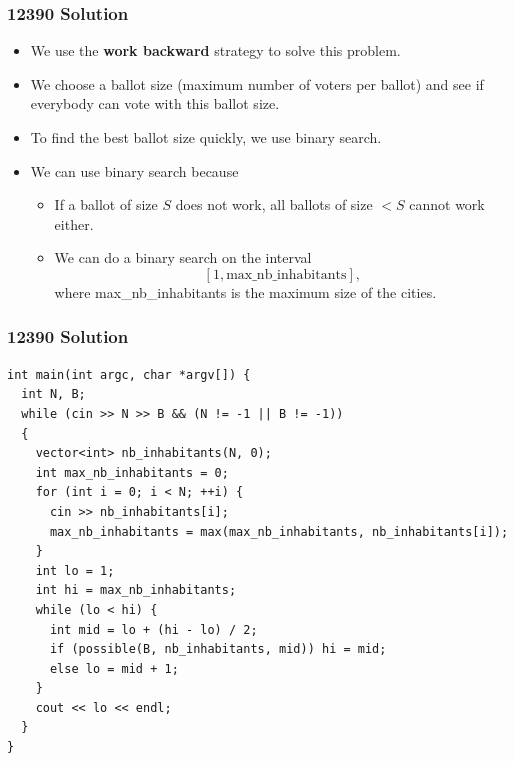 \documentclass{beamer}
\begin{document}
\begin{frame}%
\frametitle{12390 Solution}

\begin{itemize}

\item We use the \textbf{work backward} strategy to solve this problem.

\vspace{0.2cm}

\item<2-> We choose a ballot size (maximum number of voters per ballot) and see if everybody
can vote with this ballot size.

\vspace{0.2cm}

\item<3-> To find the best ballot size quickly, we use binary search.

\vspace{0.2cm}

\item<4-> We can use binary search because
\vspace{0.08cm}
\begin{itemize}
\item<4-> If a ballot of size $S$ does not work, all ballots of size $< S$ cannot work either.
\vspace{0.08cm}
\item<5-> We can do a binary search on the interval
$$
[1, \textrm{max\_nb\_inhabitants}],
$$
where \textrm{max\_nb\_inhabitants} is the maximum size of the cities.
\end{itemize}

\end{itemize}

\end{frame}

\begin{frame}[containsverbatim]
\frametitle{12390 Solution}
\scriptsize

\begin{lstlisting}[mathescape]
int main(int argc, char *argv[]) {
  int N, B;
  while (cin >> N >> B && (N != -1 || B != -1))
  {
    vector<int> nb_inhabitants(N, 0);
    int max_nb_inhabitants = 0;
    for (int i = 0; i < N; ++i) {
      cin >> nb_inhabitants[i];
      max_nb_inhabitants = max(max_nb_inhabitants, nb_inhabitants[i]);
    }
    int lo = 1;
    int hi = max_nb_inhabitants;
    while (lo < hi) {
      int mid = lo + (hi - lo) / 2;
      if (possible(B, nb_inhabitants, mid)) hi = mid;
      else lo = mid + 1;
    }
    cout << lo << endl;
  }
}
\end{lstlisting}

\end{frame}
\end{document}
